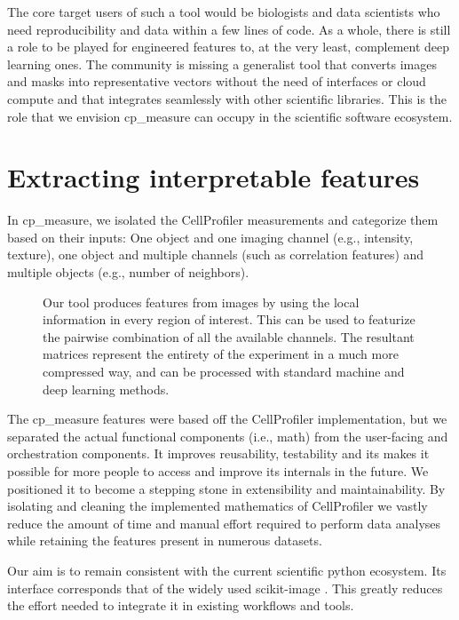 \documentclass{article}
\begin{document}
The core target users of such a tool would be biologists and data scientists who need reproducibility and data within a few lines of code. As a whole, there is still a role to be played for engineered features to, at the very least, complement deep learning ones. The community is missing a generalist tool that converts images and masks into representative vectors without the need of interfaces or cloud compute and that integrates seamlessly with other scientific libraries. This is the role that we envision cp\_measure can occupy in the scientific software ecosystem.
\section{Extracting interpretable features}
\label{sec:org61842b5}
In cp\_measure, we isolated the CellProfiler measurements and categorize them based on their inputs: One object and one imaging channel (e.g., intensity, texture), one object and multiple channels (such as correlation features) and multiple objects (e.g., number of neighbors).

\begin{figure}[htbp]
\centering

\caption{\label{fig:overview}Our tool produces features from images by using the local information in every region of interest. This can be used to featurize the pairwise combination of all the available channels. The resultant matrices represent the entirety of the experiment in a much more compressed way, and can be processed with standard machine and deep learning methods.}
\end{figure}

The cp\_measure features were based off the CellProfiler implementation, but we separated the actual functional components (i.e., math) from the user-facing and orchestration components. It improves reusability, testability and its makes it possible for more people to access and improve its internals in the future. We positioned it to become a stepping stone in extensibility and maintainability. By isolating and cleaning the implemented mathematics of CellProfiler we vastly reduce the amount of time and manual effort required to perform data analyses while retaining the features present in numerous datasets.

Our aim is to remain consistent with the current scientific python ecosystem. Its interface corresponds that of the widely used scikit-image \citep{waltScikitimageImageProcessing2014}. This greatly reduces the effort needed to integrate it in existing workflows and tools.
\end{document}
